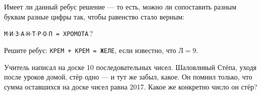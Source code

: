 ﻿
\begin{itemize}

\itA Имеет ли данный ребус решение --- то есть, можно ли сопоставить разным буквам разные цифры так, чтобы равенство стало верным:

\centerline{{\tt М$\cdot$И$\cdot$З$\cdot$А$\cdot$Н$\cdot$Т$\cdot$Р$\cdot$О$\cdot$П  = 
ХРОМОТА}\,?}

\itB Решите ребус: {\tt КРЕМ + КРЕМ = ЖЕЛЕ}, если известно, что $\text{Л}=9$.

\itC Учитель написал на доске 10 последовательных чисел. Шаловливый Стёпа, уходя после уроков домой, стёр одно — и тут же забыл, какое. Он помнил только, что сумма оставшихся на доске чисел равна 2017. Какое же конкретно число он стёр?
\end{itemize}